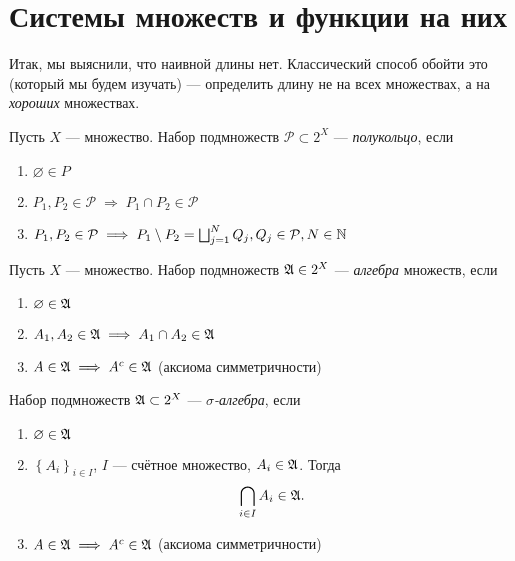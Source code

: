 \section{Системы множеств и функции на них}

Итак, мы выяснили, что наивной длины нет. Классический способ обойти это (который мы будем изучать) --- определить длину не на всех множествах, а на \textit{хороших} множествах.

\begin{df}
 Пусть $ X $ --- множество. Набор подмножеств $ \mathcal{P} \subset 2^X $ --- \textit{полукольцо}, если
 \begin{enumerate}
  \item $ \varnothing \in P $
  \item $ P_1, P_2 \in \mathcal{P} \;\Longrightarrow\; P_1 \cap P_2 \in \mathcal{P} $
  \item $ P_1, P_2 \in \mathcal{P} \;\Longrightarrow\; P_1 \setminus P_2 = \bigsqcup_{j=1}^N Q_j, Q_j \in \mathcal{P}, N \in \mathbb{N} $
 \end{enumerate}
\end{df}
\begin{df}
 Пусть $ X $ --- множество. Набор подмножеств $ \mathfrak{A} \in 2^X $ --- \textit{алгебра} множеств, если
 \begin{enumerate}
  \item $ \varnothing \in \mathfrak{A} $
  \item $ A_1, A_2 \in \mathfrak{A} \;\Longrightarrow\; A_1 \cap A_2 \in \mathfrak{A} $
  \item $ A \in \mathfrak{A} \;\Longrightarrow\; A^c \in \mathfrak{A} $ (аксиома симметричности)
 \end{enumerate}
\end{df}
\begin{df}
 Набор подмножеств $ \mathfrak{A} \subset 2^X $ --- \textit{$ \sigma $-алгебра}, если
 \begin{enumerate}
  \item $ \varnothing \in \mathfrak{A} $
  \item $ \left\{ A_i \right\}_{i \in I} $, $ I $ --- счётное множество, $ A_i \in \mathfrak{A} $. Тогда
   \begin{align*}
    \bigcap_{i \in I} A_i \in \mathfrak{A}
   .\end{align*}
  \item $ A \in \mathfrak{A} \;\Longrightarrow\; A^c \in \mathfrak{A} $ (аксиома симметричности)
 \end{enumerate}
\end{df}
